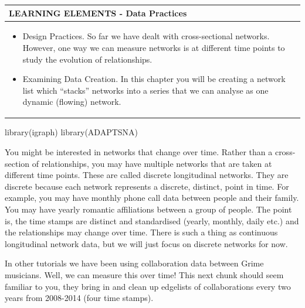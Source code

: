 \documentclass[
  letterpaper,
  DIV=11,
  numbers=noendperiod]{scrreprt}
\newenvironment{Shaded}{\begin{snugshade}}{\end{snugshade}}
\newcommand{\FunctionTok}[1]{\textcolor[rgb]{0.28,0.35,0.67}{#1}}
\newcommand{\NormalTok}[1]{\textcolor[rgb]{0.00,0.23,0.31}{#1}}
\begin{document}
\begin{longtable}[]{@{}
  >{\raggedright\arraybackslash}p{}@{}}
\toprule\noalign{}
\begin{minipage}[b]{\linewidth}\raggedright
LEARNING ELEMENTS - Data Practices
\end{minipage} \\
\midrule\noalign{}
\endhead
\bottomrule\noalign{}
\endlastfoot
\begin{minipage}[t]{\linewidth}\raggedright
\begin{itemize}
\item
  Design Practices. So far we have dealt with cross-sectional networks.
  However, one way we can measure networks is at different time points
  to study the evolution of relationships.
\item
  Examining Data Creation. In this chapter you will be creating a
  network list which ``stacks'' networks into a series that we can
  analyse as one dynamic (flowing) network.
\end{itemize}
\end{minipage} \\
\end{longtable}

\begin{Shaded}
\begin{Highlighting}[]
\FunctionTok{library}\NormalTok{(igraph)}
\FunctionTok{library}\NormalTok{(ADAPTSNA)}
\end{Highlighting}
\end{Shaded}

You might be interested in networks that change over time. Rather than a
cross-section of relationships, you may have multiple networks that are
taken at different time points. These are called discrete longitudinal
networks. They are discrete because each network represents a discrete,
distinct, point in time. For example, you may have monthly phone call
data between people and their family. You may have yearly romantic
affiliations between a group of people. The point is, the time stamps
are distinct and standardised (yearly, monthly, daily etc.) and the
relationships may change over time. There is such a thing as continuous
longitudinal network data, but we will just focus on discrete networks
for now.

In other tutorials we have been using collaboration data between Grime
musicians. Well, we can measure this over time! This next chunk should
seem familiar to you, they bring in and clean up edgelists of
collaborations every two years from 2008-2014 (four time stamps).
\end{document}
